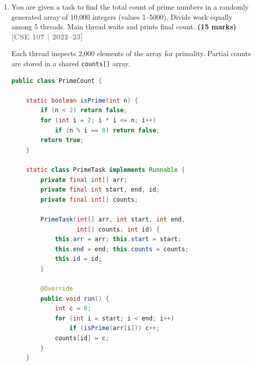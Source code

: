 \documentclass[12pt,a3paper]{article}
\newcommand{\yr}[1]{\hfill\textcolor{gray}{\small\textbf{[#1]}}}
\newcommand{\mk}[1]{\textcolor{orange!70!black}{\small\textbf{(#1 marks)}}}
\begin{document}
\begin{enumerate}
\begin{tcolorbox}
\begin{lstlisting}[language=Java]
public class Fix2 {
    public static void main(String[] args) throws Exception {
        List<String> list = new ArrayList<>();
        MyThreadSync t1 = new MyThreadSync(list);
        MyThreadSync t2 = new MyThreadSync(list);
        t1.t.join(); t2.t.join();
        System.out.println(list.size()); // always 20000
    }
}
\end{lstlisting}

\textit{Note: \texttt{Collections.synchronizedList(new ArrayList<>())}
is also a valid Fix 2 alternative --- it wraps every method with a
synchronized block automatically.}

\end{tcolorbox}

\item You are given a task to find the total count of prime numbers in a randomly generated array of 10{,}000 integers (values 1--5000). Divide work equally among 5 threads. Main thread waits and prints final count. \mk{15}
\yr{CSE 107 | 2022--23}

\begin{tcolorbox}[enhanced,breakable,ansbox,
  colback=cF!4,colframe=cF,boxrule=0.8pt,arc=5pt,
  title={\textbf{Answer --- Parallel Prime Count in 10{,}000-Element Array (5 Threads)}},
  fonttitle=\bfseries\color{white},colbacktitle=cF]

Each thread inspects 2{,}000 elements of the array for primality.
Partial counts are stored in a shared \texttt{counts[]} array.

\begin{lstlisting}[language=Java]
public class PrimeCount {

    static boolean isPrime(int n) {
        if (n < 2) return false;
        for (int i = 2; i * i <= n; i++)
            if (n % i == 0) return false;
        return true;
    }

    static class PrimeTask implements Runnable {
        private final int[] arr;
        private final int start, end, id;
        private final int[] counts;

        PrimeTask(int[] arr, int start, int end,
                  int[] counts, int id) {
            this.arr = arr; this.start = start;
            this.end = end; this.counts = counts;
            this.id = id;
        }

        @Override
        public void run() {
            int c = 0;
            for (int i = start; i < end; i++)
                if (isPrime(arr[i])) c++;
            counts[id] = c;
        }
    }


\end{lstlisting}
\end{tcolorbox}
\end{enumerate}
\end{document}
